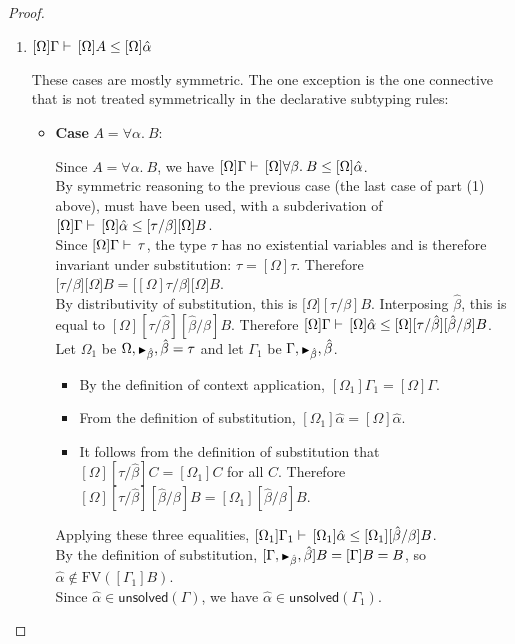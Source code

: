 \documentclass[a4paper]{article}
\newcommand{\smallblacktriangle}{\text{\textscale{0.7}{$\blacktriangleright$}}}
\def\CompactJudgments{0}
\newcommand{\entails}{\mathrel{\ifnum\CompactJudgments=1\vdash \else \vdash\,\fi}}
\newcommand{\MonnierCommaSym}{{\smallblacktriangle}}
\newcommand{\MonnierComma}[1]{{\MonnierCommaSym}_{#1}}
\newcommand{\FV}[1]{\mathrm{FV}(#1)}
\newcommand{\ProofCaseRule}[1]{\item \textbf{Case }\textrm{{#1}}: ~ }
\newcommand{\xunsolved}{\mathsf{unsolved}}
\newcommand{\unsolved}[1]{\xunsolved(#1)}
\newcommand{\AllSym}{\forall}
\newcommand{\xAll}[1]{\AllSym#1}
\newcommand{\All}[1]{\xAll{#1}.\:}
\newcommand{\declsubjudg}[3]{\ensuremath{{#1} \entails {#2} \declsubtype {#3}}}
\newcommand{\hypeq}[2]{{#1} = {#2}}
\newcommand{\alltype}[1]{\All{#1}}
\newcommand{\judgetp}[2]{{#1} \entails {#2}}
\newcommand{\ahat}{\hat{\alpha}}
\newcommand{\bhat}{\hat{\beta}}
\begin{document}
\begin{proof}
\begin{enumerate}[(1)]
  \item $\declsubjudg{[\Omega]\Gamma}{[\Omega]A}{[\Omega]\ahat}$

    These cases are mostly symmetric.  The one exception is the one connective that is not treated symmetrically
    in the declarative subtyping rules:
    \begin{itemize}
      \ProofCaseRule{$A = \alltype{\alpha}{B}$}

      Since $A = \alltype{\alpha}{B}$, we have
      $\declsubjudg{[\Omega]\Gamma}{[\Omega]\alltype{\beta}{B}}{[\Omega]\ahat}$. \\
      By symmetric reasoning to the previous case (the last case of part (1) above), \DsubAllL must have been
      used, with a subderivation of
      $\declsubjudg{[\Omega]\Gamma}{[\Omega]\ahat}{[\tau/\beta][\Omega]B}$. \\
      Since $\judgetp{[\Omega]\Gamma}{\tau}$, the type $\tau$ has no existential variables and is
      therefore invariant under substitution: $\tau = [\Omega]\tau$.
      Therefore $\big[\tau/\beta\big]\big[\Omega\big]B = \big[[\Omega]\tau/\beta\big]\big[\Omega\big]B$. \\
      By distributivity of substitution, this is $\big[\Omega\big][\tau/\beta]B$.
      Interposing $\bhat$, this is equal to $[\Omega][\tau/\bhat][\bhat/\beta]B$.
      Therefore
      $\declsubjudg{[\Omega]\Gamma}{[\Omega]\ahat}{[\Omega][\tau/\bhat][\bhat/\beta]B}$. \\
      Let $\Omega_1$ be $\Omega, \MonnierComma{\bhat}, \hypeq{\bhat}{\tau}$
      and let $\Gamma_1$ be $\Gamma, \MonnierComma{\bhat}, \bhat$.

      \begin{itemize}
          \item 
            By the definition of context application, $[\Omega_1]\Gamma_1 = [\Omega]\Gamma$.

          \item
            From the definition of substitution, $[\Omega_1]\ahat = [\Omega]\ahat$.

          \item
            It follows from the definition of substitution that $[\Omega][\tau/\bhat]C = [\Omega_1]C$ for all $C$.
            Therefore $[\Omega][\tau/\bhat][\bhat/\beta]B = [\Omega_1][\bhat/\beta]B$.
      \end{itemize}

      Applying these three equalities, $\declsubjudg{[\Omega_1]\Gamma_1}{[\Omega_1]\ahat}{[\Omega_1][\bhat/\beta]B}$. \\
      By the definition of substitution, $[\Gamma, \MonnierComma{\bhat}, \bhat]B = [\Gamma]B = B$, so $\ahat \notin \FV{[\Gamma_1]B}$. \\
      Since $\ahat \in \unsolved{\Gamma}$, we have $\ahat \in \unsolved{\Gamma_1}$. \\


\end{itemize}
\end{enumerate}
\end{proof}
\end{document}
